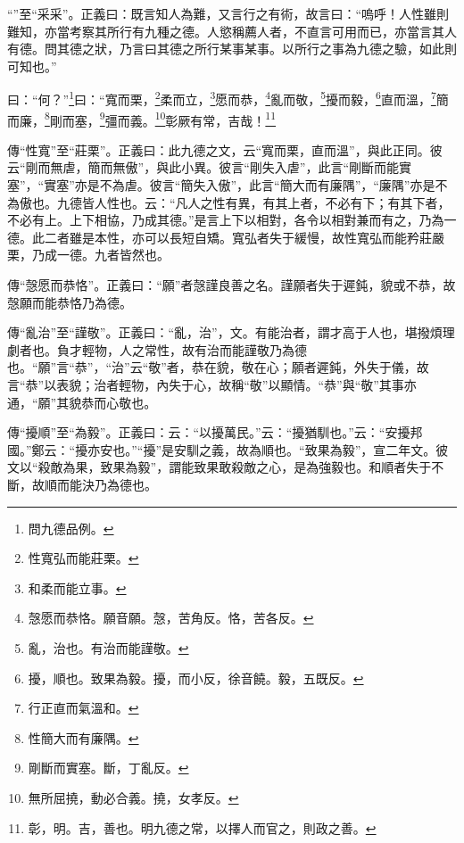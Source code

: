 {\noindent\shu{}\fzkt “”至“采采”。正義曰：既言知人為難，又言行之有術，故言曰：“嗚呼！人性雖則難知，亦當考察其所行有九種之德。人慾稱薦人者，不直言可用而已，亦當言其人有德。問其德之狀，乃言曰其德之所行某事某事。以所行之事為九德之驗，如此則可知也。” \par}

曰：“何？”\footnote{問九德品例。}曰：“寬而栗，\footnote{性寬弘而能莊栗。}柔而立，\footnote{和柔而能立事。}愿而恭，\footnote{愨愿而恭恪。願音願。愨，苦角反。恪，苦各反。}亂而敬，\footnote{亂，治也。有治而能謹敬。}擾而毅，\footnote{擾，順也。致果為毅。擾，而小反，徐音饒。毅，五既反。}直而溫，\footnote{行正直而氣溫和。}簡而廉，\footnote{性簡大而有廉隅。}剛而塞，\footnote{剛斷而實塞。斷，丁亂反。}彊而義。\footnote{無所屈撓，動必合義。撓，女孝反。}彰厥有常，吉哉！\footnote{彰，明。吉，善也。明九德之常，以擇人而官之，則政之善。}

{\noindent\zhuan{}\fzbyks 傳“性寬”至“莊栗”。正義曰：此九德之文，云“寬而栗，直而溫”，與此正同。彼云“剛而無虐，簡而無傲”，與此小異。彼言“剛失入虐”，此言“剛斷而能實塞”，“實塞”亦是不為虐。彼言“簡失入傲”，此言“簡大而有廉隅”，“廉隅”亦是不為傲也。九德皆人性也。云：“凡人之性有異，有其上者，不必有下；有其下者，不必有上。上下相協，乃成其德。”是言上下以相對，各令以相對兼而有之，乃為一德。此二者雖是本性，亦可以長短自矯。寬弘者失于緩慢，故性寬弘而能矜莊嚴栗，乃成一德。九者皆然也。 \par}

{\noindent\zhuan{}\fzbyks 傳“愨愿而恭恪”。正義曰：“願”者愨謹良善之名。謹願者失于遲鈍，貌或不恭，故愨願而能恭恪乃為德。 \par}

{\noindent\zhuan{}\fzbyks 傳“亂治”至“謹敬”。正義曰：“亂，治”，文。有能治者，謂才高于人也，堪撥煩理劇者也。負才輕物，人之常性，故有治而能謹敬乃為德也。“願”言“恭”，“治”云“敬”者，恭在貌，敬在心；願者遲鈍，外失于儀，故言“恭”以表貌；治者輕物，內失于心，故稱“敬”以顯情。“恭”與“敬”其事亦通，“願”其貌恭而心敬也。 \par}

{\noindent\zhuan{}\fzbyks 傳“擾順”至“為毅”。正義曰：云：“以擾萬民。”云：“擾猶馴也。”云：“安擾邦國。”鄭云：“擾亦安也。”“擾”是安馴之義，故為順也。“致果為毅”，宣二年文。彼文以“殺敵為果，致果為毅”，謂能致果敢殺敵之心，是為強毅也。和順者失于不斷，故順而能決乃為德也。 \par}

